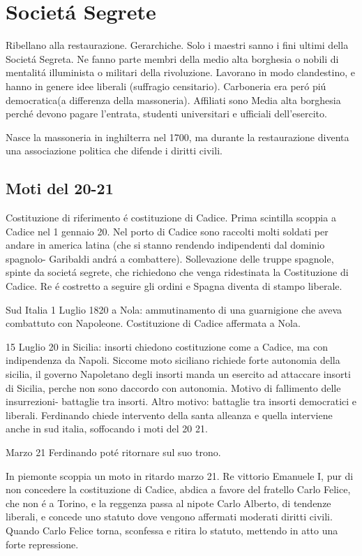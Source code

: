 \documentclass{article}
\begin{document}
\section{Societá Segrete}
Ribellano alla restaurazione. Gerarchiche. Solo i maestri sanno i fini ultimi della Societá Segreta. Ne fanno parte membri della medio alta borghesia o nobili di mentalitá illuminista o militari della rivoluzione. Lavorano in modo clandestino, e hanno in genere idee liberali (suffragio censitario). Carboneria era peró piú democratica(a differenza della massoneria). Affiliati sono Media alta borghesia perché devono pagare l'entrata, studenti universitari e ufficiali dell'esercito.

Nasce la massoneria in inghilterra nel 1700, ma durante la restaurazione diventa una associazione politica che difende i diritti civili.

\subsection{Moti del 20-21}
Costituzione di riferimento é costituzione di Cadice. Prima scintilla scoppia a Cadice nel 1 gennaio 20. Nel porto di Cadice sono raccolti molti soldati per andare in america latina (che si stanno rendendo indipendenti dal dominio spagnolo- Garibaldi andrá a combattere). Sollevazione delle truppe spagnole, spinte da societá segrete, che richiedono che venga ridestinata la Costituzione di Cadice. Re é costretto a seguire gli ordini e Spagna diventa di stampo liberale.

Sud Italia 1 Luglio 1820 a Nola: ammutinamento di una guarnigione che aveva combattuto con Napoleone. Costituzione di Cadice affermata a Nola.

15 Luglio 20 in Sicilia: insorti chiedono costituzione come a Cadice, ma con indipendenza da Napoli. Siccome moto siciliano richiede forte autonomia della sicilia, il governo Napoletano degli insorti manda un esercito ad attaccare insorti di Sicilia, perche non sono daccordo con autonomia. Motivo di fallimento delle insurrezioni- battaglie tra insorti. Altro motivo: battaglie tra insorti democratici e liberali. Ferdinando chiede intervento della santa alleanza e quella interviene anche in sud italia, soffocando i moti del 20 21.

Marzo 21 Ferdinando poté ritornare sul suo trono.

In piemonte scoppia un moto in ritardo marzo 21. Re vittorio Emanuele I, pur di non concedere la costituzione di Cadice, abdica a favore del fratello Carlo Felice, che non é a Torino, e la reggenza passa al nipote Carlo Alberto, di tendenze liberali, e concede uno statuto dove vengono affermati moderati diritti civili. Quando Carlo Felice torna, sconfessa e ritira lo statuto, mettendo in atto una forte repressione.
\end{document}
